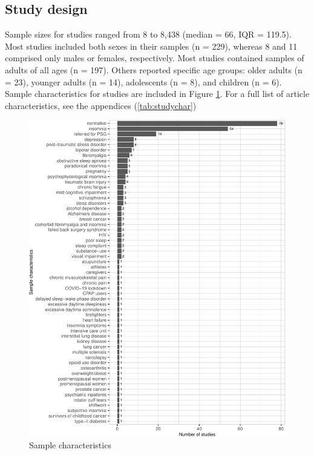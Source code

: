 \documentclass[
]{article}
\begin{document}
\subsection{Study design}\label{resultsandsynthesis}

Sample sizes for studies ranged from 8 to 8,438 (median = 66, IQR = 119.5). Most studies included both sexes in their samples (n = 229), whereas 8 and 11 comprised only males or females, respectively. Most studies contained samples of adults of all ages (n = 197). Others reported specific age groups: older adults (n = 23), younger adults (n = 14), adolescents (n = 8), and children (n = 6). Sample characteristics for studies are included in Figure \ref{fig:samplechar}. For a full list of article characteristics, see the appendices (\ref{tab:studychar})

\begin{figure}
\centering
\includegraphics{review_markdown_files/figure-latex/samplechar-1.pdf}
\caption{\label{fig:samplechar}Sample characteristics}
\end{figure}
\end{document}
